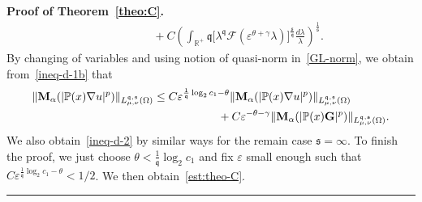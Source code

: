 \documentclass[a4paper, 11pt]{article}
\newenvironment{proof}[1][Proof]{\textbf{#1.} }{\hfill\rule{0.5em}{0.5em}}
\begin{document}
\begin{proof}[Proof of Theorem~\ref{theo:C}]
\begin{align}
& \qquad \qquad + C \left(\int_{\mathbb{R}^+} \mathfrak{q} \big[\lambda^{\mathfrak{q}}\mathcal{F}(\varepsilon^{\theta+\gamma}\lambda)\big]^{\frac{\mathfrak{s}}{\mathfrak{q}}} \frac{d\lambda}{\lambda}\right)^{\frac{1}{\mathfrak{s}}}. \label{ineq-d-1b} 
\end{align}
By changing of variables and using notion of quasi-norm in~\eqref{GL-norm}, we obtain from~\eqref{ineq-d-1b} that
\begin{align}\notag
 \|\mathbf{M}_{\alpha}(|\mathbb{P}(x)\nabla u|^{p})\|_{L^{\mathfrak{q},\mathfrak{s}}_{\mu,\nu}(\Omega)} & \le C \varepsilon^{\frac{1}{\mathfrak{q}}\log_2 c_1 - \theta}  \|\mathbf{M}_{\alpha}(|\mathbb{P}(x)\nabla u|^{p})\|_{L^{\mathfrak{q},\mathfrak{s}}_{\mu,\nu}(\Omega)} \\
 & \hspace{2cm} + C \varepsilon^{-\theta-\gamma} \|\mathbf{M}_{\alpha}(|\mathbb{P}(x)\mathbf{G}|^{p})\|_{L^{\mathfrak{q},\mathfrak{s}}_{\mu,\nu}(\Omega)}.\label{ineq-d-2}
\end{align}
We also obtain~\eqref{ineq-d-2} by similar ways for the remain case $\mathfrak{s} = \infty$. To finish the proof, we just choose $\theta<\frac{1}{\mathfrak{q}}\log_2 c_1$ and fix $\varepsilon$ small enough such that $C \varepsilon^{\frac{1}{\mathfrak{q}}\log_2 c_1 - \theta}<1/2$. We then obtain~\eqref{est:theo-C}.
\end{proof}
\end{document}
